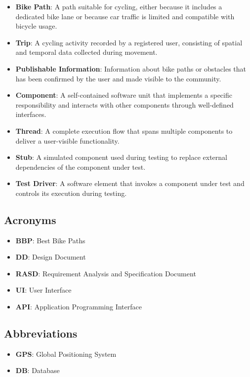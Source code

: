 \begin{itemize}
    \item \textbf{Bike Path}: A path suitable for cycling, either because it includes a dedicated bike lane or because car traffic is limited and compatible with bicycle usage.
    \item \textbf{Trip}: A cycling activity recorded by a registered user, consisting of spatial and temporal data collected during movement.
    \item \textbf{Publishable Information}: Information about bike paths or obstacles that has been confirmed by the user and made visible to the community.
    \item \textbf{Component}: A self-contained software unit that implements a specific responsibility and interacts with other components through well-defined interfaces.
    \item \textbf{Thread}: A complete execution flow that spans multiple components to deliver a user-visible functionality.
    \item \textbf{Stub}: A simulated component used during testing to replace external dependencies of the component under test.
    \item \textbf{Test Driver}: A software element that invokes a component under test and controls its execution during testing.
\end{itemize}

\subsection{Acronyms}

\begin{itemize}
    \item \textbf{BBP}: Best Bike Paths
    \item \textbf{DD}: Design Document
    \item \textbf{RASD}: Requirement Analysis and Specification Document
    \item \textbf{UI}: User Interface
    \item \textbf{API}: Application Programming Interface
\end{itemize}

\subsection{Abbreviations}

\begin{itemize}
    \item \textbf{GPS}: Global Positioning System
    \item \textbf{DB}: Database
\end{itemize}

